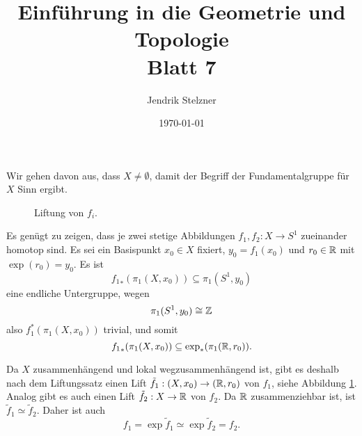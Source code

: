 \documentclass[a4paper,10pt]{article}
\title{\sc Einführung in die Geometrie und Topologie \\ \Large Blatt 7}
\author{Jendrik Stelzner}
\date{\today}
\begin{document}
\maketitle





\section{}
Wir gehen davon aus, dass $X \neq \emptyset$, damit der Begriff der Fundamentalgruppe für $X$ Sinn ergibt.

\begin{figure}[ht]\centering
 \caption{Liftung von $f_i$.}
 \label{fig: Liftung von f_i}
\end{figure}

Es genügt zu zeigen, dass je zwei stetige Abbildungen $f_1, f_2 : X \to S^1$ zueinander homotop sind. Es sei ein Basispunkt $x_0 \in X$ fixiert, $y_0 = f_1(x_0)$ und $r_0 \in \mathbb{R}$ mit $\exp(r_0) = y_0$. Es ist
\[
 {f_1}_* (\pi_1(X,x_0)) \subseteq \pi_1(S^1, y_0)
\]
eine endliche Untergruppe, wegen
\[
 \pi_1(S^1, y_0) \cong \mathbb{Z}
\]
also $f_1^*(\pi_1(X,x_0))$ trivial, und somit
\[
 {f_1}_*(\pi_1(X,x_0)) \subseteq \exp_*(\pi_1(\mathbb{R},r_0)).
\]

Da $X$ zusammenhängend und lokal wegzusammenhängend ist, gibt es deshalb nach dem Liftungssatz einen Lift $\tilde{f}_1 : (X,x_0) \to (\mathbb{R}, r_0)$ von $f_1$, siehe Abbildung \ref{fig: Liftung von f_i}. Analog gibt es auch einen Lift $\tilde{f}_2 : X \to \mathbb{R}$ von $f_2$. Da $\mathbb{R}$ zusammenziehbar ist, ist $\tilde{f}_1 \simeq \tilde{f}_2$. Daher ist auch
\[
 f_1 = \exp \tilde{f}_1 \simeq \exp \tilde{f}_2 = f_2.
\]
\end{document}
